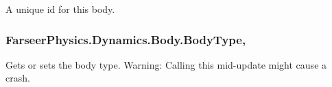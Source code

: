 A unique id for this body. 

\hypertarget{class_farseer_physics_1_1_dynamics_1_1_body_a5cab6dcf07e3bfbc0a6546e031dca134}{
\subsubsection[{Body\+Type}]{ Farseer\+Physics.\+Dynamics.\+Body.\+Body\+Type\hspace{0.3cm}{\ttfamily [get]}, {\ttfamily [set]}}}\label{class_farseer_physics_1_1_dynamics_1_1_body_a5cab6dcf07e3bfbc0a6546e031dca134}


Gets or sets the body type. Warning\+: Calling this mid-\/update might cause a crash. 

